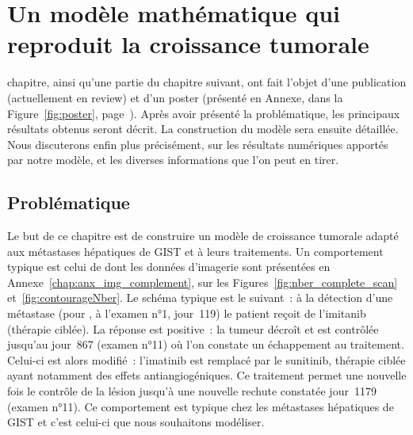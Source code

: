\documentclass[main.tex]{subfiles}
\begin{document}
\chapter{Un modèle mathématique qui reproduit la croissance tumorale \label{chap:modele_EDP}}


 chapitre, ainsi qu'une partie du chapitre suivant, %
ont  fait l'objet d'une publication (actuellement en review) et d'un poster (présenté en Annexe, dans la Figure~\ref{fig:poster}, page~\pageref{fig:poster}). %
Après avoir présenté la problématique, les principaux résultats obtenus seront décrit.  
La construction du modèle sera ensuite détaillée. Nous discuterons enfin plus précisément, sur les résultats numériques apportés par notre modèle, et les diverses informations que l'on peut en tirer.

\section{Problématique}
Le but de ce chapitre est de construire un modèle de croissance tumorale adapté aux métastases hépatiques de GIST et à leurs traitements. Un comportement typique est celui de \Nber dont les données d'imagerie sont présentées en Annexe~\ref{chap:anx_img_complement}, sur les Figures~\ref{fig:nber_complete_scan} et~\ref{fig:contourageNber}. Le schéma typique est le suivant~: à la détection d'une métastase (pour \Nber, à l'examen n°1, jour~119) le patient reçoit de l'imitanib (thérapie ciblée). La réponse est positive~: la tumeur décroît et est contrôlée jusqu'au jour~867 (examen n°11) où l'on constate un échappement au traitement. Celui-ci est alors modifié~: l'imatinib est  remplacé par le sunitinib, thérapie ciblée ayant notamment des effets antiangiogéniques. Ce traitement permet une nouvelle fois le contrôle de la lésion jusqu'à une nouvelle rechute constatée jour~1179 (examen n°11). Ce comportement est typique chez les métastases hépatiques de GIST et c'est celui-ci que nous souhaitons modéliser.
\end{document}
